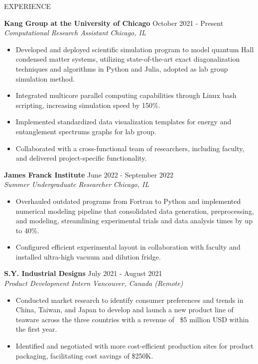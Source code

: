 \documentclass{resume} %
\begin{document}
\vspace{-0.5em}
\begin{rSection}{EXPERIENCE}

\textbf{Kang Group at the University of Chicago} \hfill October 2021 - Present\\
\textit{Computational Research Assistant} \hfill \textit{Chicago, IL}
\vspace{-0.6em}
 \begin{itemize}
   \itemsep -5.8pt {}
   \item Developed and deployed scientific simulation program to model quantum Hall condensed matter systems, utilizing state-of-the-art exact diagonalization techniques and algorithms in Python and Julia, adopted as lab group simulation method. 
   \item Integrated multicore parallel computing capabilities through Linux bash scripting, increasing simulation speed by 150\%.
   \item Implemented standardized data visualization templates for energy and entanglement spectrums graphs for lab group.
   \item Collaborated with a cross-functional team of researchers, including faculty, and delivered project-specific functionality. 
\end{itemize}


\textbf{James Franck Institute} \hfill June 2022  - September 2022 \\
\textit{Summer Undergraduate Researcher} \hfill \textit{Chicago, IL}
\vspace{-0.6em}
 \begin{itemize}
   \itemsep -5.8pt {}
   \item Overhauled outdated programs from Fortran to Python and implemented numerical modeling pipeline that consolidated data generation, preprocessing, and modeling, streamlining experimental trials and data analysis times by up to 40\%.
   \item Configured efficient experimental layout in collaboration with faculty and installed ultra-high vacuum and dilution fridge.
    
 \end{itemize}

 \textbf{S.Y. Industrial Designs} \hfill July 2021  - August 2021 \\
\textit{Product Development Intern} \hfill \textit{Vancouver, Canada (Remote)}
\vspace{-0.6em}
 \begin{itemize}
   \itemsep -5.8pt {}
   \item Conducted market research to identify consumer preferences and trends in China, Taiwan, and Japan to develop and launch a new product line of teaware across the three countries with a revenue of ~\$5 million USD within the first year.
   \item Identified and negotiated with more cost-efficient production sites for product packaging, facilitating cost savings of \$250K.
  

\end{itemize}
\end{rSection}
\end{document}
